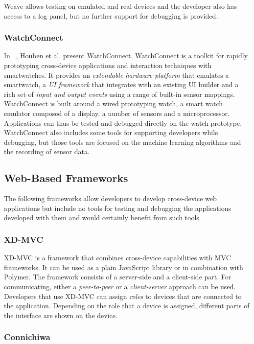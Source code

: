 Weave allows testing on emulated and real devices and the developer also has access to a log panel, but no further support for debugging is provided. 

\subsubsection{WatchConnect}

In ~\cite{watchconnect2015}, Houben et al. present WatchConnect. WatchConnect is a toolkit for rapidly prototyping cross-device applications and interaction techniques with smartwatches. It provides an \emph{extendable hardware platform} that emulates a smartwatch, a \emph{UI framework} that integrates with an existing UI builder and a rich set of \emph{input and output events} using a range of built-in sensor mappings. WatchConnect is built around a wired prototyping watch, a smart watch emulator composed of a display, a number of sensors and a microprocessor. Applications can thus be tested and debugged directly on the watch prototype. WatchConnect also includes some tools for supporting developers while debugging, but those tools are focused on the machine learning algorithms and the recording of sensor data.

\subsection{Web-Based Frameworks}

The following frameworks allow developers to develop cross-device web applications but include no tools for testing and debugging the applications developed with them and would certainly benefit from such tools.

\subsubsection{XD-MVC}

XD-MVC is a framework that combines cross-device capabilities with MVC frameworks. It can be used as a plain JavaScript library or in combination with Polymer. The framework consists of a server-side and a client-side part. For communicating, either a \emph{peer-to-peer} or a \emph{client-server} approach can be used. Developers that use XD-MVC can assign \emph{roles} to devices that are connected to the application. Depending on the role that a device is assigned, different parts of the interface are shown on the device. 

\subsubsection{Connichiwa}

